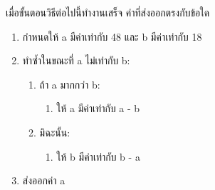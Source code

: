 \question เมื่อขั้นตอนวิธีต่อไปนี้ทำงานเสร็จ ค่าที่ส่งออกตรงกับข้อใด
\begin{pseudocode}
    \begin{enumerate}
        \item กำหนดให้ a มีค่าเท่ากับ 48 และ b มีค่าเท่ากับ 18
        \item ทำซ้ำในขณะที่ a ไม่เท่ากับ b:
        \begin{enumerate}
            \item ถ้า a มากกว่า b:
            \begin{enumerate}
                \item ให้ a มีค่าเท่ากับ a - b
            \end{enumerate}
            \item มิฉะนั้น:
            \begin{enumerate}
                \item ให้ b มีค่าเท่ากับ b - a
            \end{enumerate}
        \end{enumerate}
        \item ส่งออกค่า a
    \end{enumerate}
\end{pseudocode}
